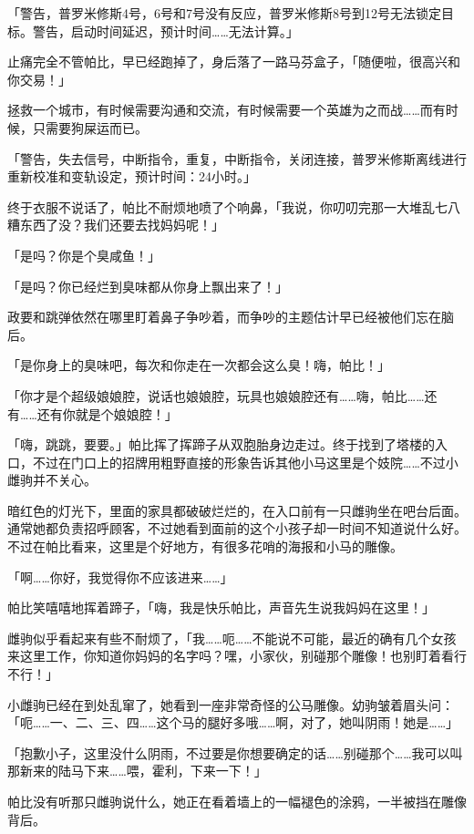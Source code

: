 「{\mt 警告，普罗米修斯4号，6号和7号没有反应，普罗米修斯8号到12号无法锁定目标。警告，启动时间延迟，预计时间……无法计算。}」

止痛完全不管帕比，早已经跑掉了，身后落了一路马芬盒子，「随便啦，很高兴和你交易！」

拯救一个城市，有时候需要沟通和交流，有时候需要一个英雄为之而战……而有时候，只需要狗屎运而已。

「{\mt 警告，失去信号，中断指令，重复，中断指令，关闭连接，普罗米修斯离线进行重新校准和变轨设定，预计时间：24小时。}」

终于衣服不说话了，帕比不耐烦地喷了个响鼻，「我说，你叨叨完那一大堆乱七八糟东西了没？我们还要去找妈妈呢！」

\horizonline


「是吗？你是个臭咸鱼！」

「是吗？你已经烂到臭味都从你身上飘出来了！」

政要和跳弹依然在哪里盯着鼻子争吵着，而争吵的主题估计早已经被他们忘在脑后。

「是你身上的臭味吧，每次和你走在一次都会这么臭！嗨，帕比！」

「你才是个超级娘娘腔，说话也娘娘腔，玩具也娘娘腔还有……嗨，帕比……还有……还有你就是个娘娘腔！」

「嗨，跳跳，要要。」帕比挥了挥蹄子从双胞胎身边走过。终于找到了塔楼的入口，不过在门口上的招牌用粗野直接的形象告诉其他小马这里是个妓院……不过小雌驹并不关心。

暗红色的灯光下，里面的家具都破破烂烂的，在入口前有一只雌驹坐在吧台后面。通常她都负责招呼顾客，不过她看到面前的这个小孩子却一时间不知道说什么好。不过在帕比看来，这里是个好地方，有很多花哨的海报和小马的雕像。

「啊……你好，我觉得你不应该进来……」

帕比笑嘻嘻地挥着蹄子，「嗨，我是快乐帕比，声音先生说我妈妈在这里！」

雌驹似乎看起来有些不耐烦了，「我……呃……不能说不可能，最近的确有几个女孩来这里工作，你知道你妈妈的名字吗？嘿，小家伙，别碰那个雕像！也别盯着看行不行！」

小雌驹已经在到处乱窜了，她看到一座非常奇怪的公马雕像。幼驹皱着眉头问：「呃……一、二、三、四……这个马的腿好多哦……啊，对了，她叫阴雨！她是……」

「抱歉小子，这里没什么阴雨，不过要是你想要确定的话……别碰那个……我可以叫那新来的陆马下来……喂，霍利，下来一下！」

帕比没有听那只雌驹说什么，她正在看着墙上的一幅褪色的涂鸦，一半被挡在雕像背后。

